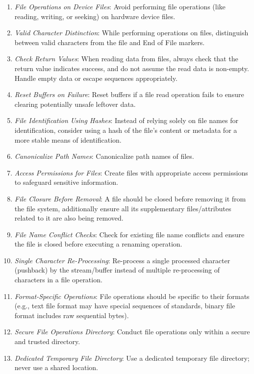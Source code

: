 \documentclass[9pt]{IEEEtran} %
\begin{document}
\begin{enumerate}
  \item \textit{File Operations on Device Files}: Avoid performing file operations (like reading, writing, or seeking) on hardware device files.
  \item \textit{Valid Character Distinction}: While performing operations on files, distinguish between valid characters from the file and End of File markers.
  \item \textit{Check Return Values}: When reading data from files, always check that the return value indicates success, and do not assume the read data is non-empty. Handle empty data or escape sequences appropriately.
  \item \textit{Reset Buffers on Failure}: Reset buffers if a file read operation fails to ensure clearing potentially unsafe leftover data.
  \item \textit{File Identification Using Hashes}: Instead of relying solely on file names for identification, consider using a hash of the file's content or metadata for a more stable means of identification.
  \item \textit{Canonicalize Path Names}: Canonicalize path names of files. 
  \item \textit{Access Permissions for Files}: Create files with appropriate access permissions to safeguard sensitive information. 
  \item \textit{File Closure Before Removal}: A file should be closed before removing it from the file system, additionally ensure all its supplementary files/attributes related to it are also being removed.
  \item \textit{File Name Conflict Checks}: Check for existing file name conflicts and ensure the file is closed before executing a renaming operation.
  \item \textit{Single Character Re-Processing}: Re-process a single processed character (pushback) by the stream/buffer instead of multiple re-processing of characters in a file operation.
  \item \textit{Format-Specific Operations}: File operations should be specific to their formats (e.g., text file format may have special sequences of standards, binary file format includes raw sequential bytes).
  \item \textit{Secure File Operations Directory}: Conduct file operations only within a secure and trusted directory. 
  \item \textit{Dedicated Temporary File Directory}: Use a dedicated temporary file directory; never use a shared location.

\end{enumerate}
\end{document}
